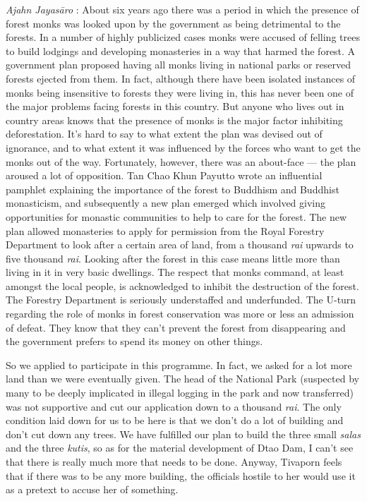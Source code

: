 \emph{Ajahn Jayasāro }: About six years ago there was a period in which
the presence of forest monks was looked upon by the government as being
detrimental to the forests. In a number of highly publicized cases monks
were accused of felling trees to build lodgings and developing
monasteries in a way that harmed the forest. A government plan proposed
having all monks living in national parks or reserved forests ejected
from them. In fact, although there have been isolated instances of monks
being insensitive to forests they were living in, this has never been
one of the major problems facing forests in this country. But anyone who
lives out in country areas knows that the presence of monks is the major
factor inhibiting deforestation. It's hard to say to what extent the
plan was devised out of ignorance, and to what extent it was influenced
by the forces who want to get the monks out of the way. Fortunately,
however, there was an about-face --- the plan aroused a lot of
opposition. Tan Chao Khun Payutto wrote an influential pamphlet
explaining the importance of the forest to Buddhism and Buddhist
monasticism, and subsequently a new plan emerged which involved giving
opportunities for monastic communities to help to care for the forest.
The new plan allowed monasteries to apply for permission from the Royal
Forestry Department to look after a certain area of land, from a
thousand \emph{rai} upwards to five thousand \emph{rai}. Looking after
the forest in this case means little more than living in it in very
basic dwellings. The respect that monks command, at least amongst the
local people, is acknowledged to inhibit the destruction of the forest.
The Forestry Department is seriously understaffed and underfunded. The
U-turn regarding the role of monks in forest conservation was more or
less an admission of defeat. They know that they can't prevent the
forest from disappearing and the government prefers to spend its money
on other things.

So we applied to participate in this programme. In fact, we asked for a
lot more land than we were eventually given. The head of the National
Park (suspected by many to be deeply implicated in illegal logging in
the park and now transferred) was not supportive and cut our application
down to a thousand \emph{rai}. The only condition laid down for us to be
here is that we don't do a lot of building and don't cut down any trees.
We have fulfilled our plan to build the three small \emph{salas} and the
three \emph{kutis}, so as for the material development of Dtao Dam, I
can't see that there is really much more that needs to be done. Anyway,
Tivaporn feels that if there was to be any more building, the officials
hostile to her would use it as a pretext to accuse her of something.

